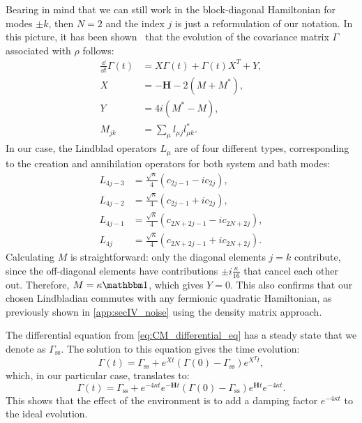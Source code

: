 Bearing in mind that we can still work in the block-diagonal Hamiltonian for modes $\pm k$, then $N=2$ and the index $j$ is just a reformulation of our notation.
In this picture, it has been shown~\cite{Bravyi2012Classical} that the evolution of the covariance matrix $\Gamma$ associated with $\rho$ follows:
\begin{align}
    \frac{\dd}{\dd t}\Gamma(t) &=X\Gamma(t)+\Gamma(t)X^T+Y\label{eq:CM_differential_eq},\\
    X                          &=-\textbf{H}-2(M+M^*),\\
    Y                          &=4i(M^*-M),\\
    M_{jk}                     &=\sum_{\mu}l_{\mu j}l_{\mu k}^*.
\end{align}
In our case, the Lindblad operators $L_\mu$ are of four different types, corresponding to the creation and annihilation operators for both system and bath modes:
\begin{align}
    L_{4j-3} &=\frac{\sqrt{\kappa}}{4}(c_{2j-1}-ic_{2j}),\\
    L_{4j-2} &=\frac{\sqrt{\kappa}}{4}(c_{2j-1}+ic_{2j}),\\
    L_{4j-1} &=\frac{\sqrt{\kappa}}{4}(c_{2N+2j-1}-ic_{2N+2j}),\\
    L_{4j}   &=\frac{\sqrt{\kappa}}{4}(c_{2N+2j-1}+ic_{2N+2j}).
\end{align}
Calculating $M$ is straightforward: only the diagonal elements $j=k$ contribute, since the off-diagonal elements have contributions $\pm i\frac{\kappa}{16}$ that cancel each other out. Therefore, $M=\kappa\Id$, which gives $Y=0$. This also confirms that our chosen Lindbladian commutes with any fermionic quadratic Hamiltonian, as previously shown in \cref{app:secIV_noise} using the density matrix approach.

The differential equation from \cref{eq:CM_differential_eq} has a steady state that we denote as $\Gamma_\text{ss}$. The solution to this equation gives the time evolution:
\begin{equation}
    \Gamma(t)=\Gamma_\text{ss}+e^{Xt}(\Gamma(0)-\Gamma_\text{ss})e^{X^T t},
\end{equation}
which, in our particular case, translates to:
\begin{equation}
    \Gamma(t)=\Gamma_\text{ss}+e^{-4\kappa t}e^{-\textbf{H}t}(\Gamma(0)-\Gamma_\text{ss})e^{\textbf{H}t}e^{-4\kappa t}.\label{eq:CM_k_time_evol}
\end{equation}
This shows that the effect of the environment is to add a damping factor $e^{-4\kappa t}$ to the ideal evolution.

